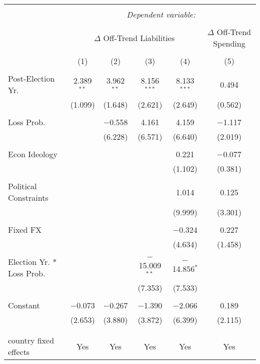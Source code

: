 
\begingroup 
\tiny 
\begin{tabular}{@{\extracolsep{5pt}}lccccc} 
\\[-1.8ex]\hline 
\hline \\[-1.8ex] 
 & \multicolumn{5}{c}{\textit{Dependent variable:}} \\ 
\cline{2-6} 
\\[-1.8ex] & \multicolumn{4}{c}{$\Delta$ Off-Trend Liabilities} & $\Delta$ Off-Trend Spending \\ 
\\[-1.8ex] & (1) & (2) & (3) & (4) & (5)\\ 
\hline \\[-1.8ex] 
 Post-Election Yr. & 2.389$^{**}$ & 3.962$^{**}$ & 8.156$^{***}$ & 8.133$^{***}$ & 0.494 \\ 
  & (1.099) & (1.648) & (2.621) & (2.649) & (0.562) \\ 
  & & & & & \\ 
 Loss Prob. &  & $-$0.558 & 4.161 & 4.159 & $-$1.117 \\ 
  &  & (6.228) & (6.571) & (6.640) & (2.019) \\ 
  & & & & & \\ 
 Econ Ideology &  &  &  & 0.221 & $-$0.077 \\ 
  &  &  &  & (1.102) & (0.381) \\ 
  & & & & & \\ 
 Political Constraints &  &  &  & 1.014 & 0.125 \\ 
  &  &  &  & (9.999) & (3.301) \\ 
  & & & & & \\ 
 Fixed FX &  &  &  & $-$0.324 & 0.227 \\ 
  &  &  &  & (4.634) & (1.458) \\ 
  & & & & & \\ 
 Election Yr. * Loss Prob. &  &  & $-$15.009$^{**}$ & $-$14.856$^{*}$ &  \\ 
  &  &  & (7.353) & (7.533) &  \\ 
  & & & & & \\ 
 Constant & $-$0.073 & $-$0.267 & $-$1.390 & $-$2.066 & 0.189 \\ 
  & (2.653) & (3.880) & (3.872) & (6.399) & (2.115) \\ 
  & & & & & \\ 
\hline \\[-1.8ex] 
country fixed effects & Yes & Yes & Yes & Yes & Yes \\ 

\end{tabular}
